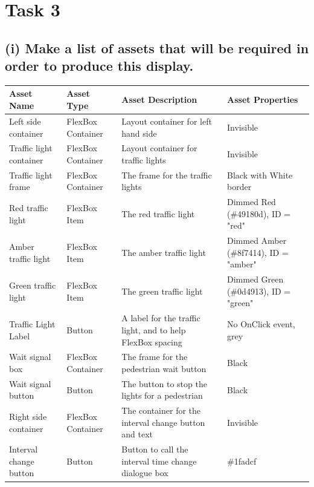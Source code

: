 \documentclass[a4paper]{article}
\begin{document}

\section{Task 3}
\subsection{(i) Make a list of assets that will be required in order to produce this display.}
\begin{center}
\begin{tabular}{ | m{9em} | m{10em} | m{15em} | m{8em} | }
  \hline
  Asset Name & Asset Type & Asset Description & Asset Properties	\\ [0.5ex] 
  \hline \hline	
  Left side container & FlexBox Container & Layout container for left hand side & Invisible \\
  \hline
  Traffic light container & FlexBox Container & Layout container for traffic lights & Invisible \\
  \hline
  Traffic light frame & FlexBox Container & The frame for the traffic lights & Black with White border \\
  \hline
  Red traffic light & FlexBox Item & The red traffic light & Dimmed Red (\#49180d), ID = "red" \\
  \hline
  Amber traffic light & FlexBox Item & The amber traffic light & Dimmed Amber (\#8f7414), ID = "amber" \\
	\hline
	Green traffic light & FlexBox Item & The green traffic light & Dimmed Green (\#0d4913), ID = "green" \\
	\hline
	Traffic Light Label & Button & A label for the traffic light, and to help FlexBox spacing & No OnClick event, grey \\
	\hline
	Wait signal box & FlexBox Container & The frame for the pedestrian wait button & Black \\
	\hline
	Wait signal button & Button & The button to stop the lights for a pedestrian & Black \\
	\hline
	Right side container & FlexBox Container & The container for the interval change button and text & Invisible \\
	\hline
	Interval change button & Button & Button to call the interval time change dialogue box & \#1fadcf \\
	\hline
\end{tabular}
\end{center}
\end{document}
